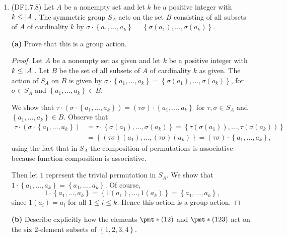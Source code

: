 \documentclass[11pt]{article}
\newcommand{\cbr}[1]{\left\{#1\right\}}
\begin{document}
\begin{enumerate}
    \item (DF1.7.8) Let $A$ be a nonempty set and let $k$ be a positive integer with $k\leq \abs{A}$. The symmetric group $S_A$ acts on the set $B$ consisting of all subsets of $A$ of cardinality $k$ by $\sigma\cdot\cbr{a_1,\dots,a_k} = \cbr{\sigma(a_1),\dots,\sigma(a_k)}$.
    
    \textbf{(a)} Prove that this is a group action. \begin{proof}
      Let $A$ be a nonempty set as given and let $k$ be a positive integer with $k\leq \abs{A}$. Let $B$ be the set of all subsets of $A$ of cardinality $k$ as given. The action of $S_A$ on $B$ is given by $\sigma\cdot\cbr{a_1,\dots,a_k} = \cbr{\sigma(a_1),\dots,\sigma(a_k)}$, for $\sigma\in S_A$ and $\cbr{a_1,\dots,a_k} \in B$.

      We show that $\tau\cdot(\sigma\cdot \cbr{a_1,\dots,a_k}) = (\tau\sigma)\cdot \cbr{a_1,\dots,a_k}$ for $\tau, \sigma\in S_A$ and $\cbr{a_1,\dots,a_k} \in B$. Observe that \begin{align*}\tau\cdot(\sigma\cdot \cbr{a_1,\dots,a_k}) &= \tau \cdot \cbr{\sigma(a_1),\dots,\sigma(a_k)} = \cbr{\tau(\sigma(a_1)),\dots,\tau(\sigma(a_k))} \\ 
      &= \cbr{(\tau\sigma)(a_1),\dots,(\tau\sigma)(a_k)} = (\tau\sigma)\cdot \cbr{a_1,\dots,a_k},\end{align*} using the fact that in $S_A$ the composition of permutations is associative because function composition is associative.

      Then let $1$ represent the trivial permutation in $S_A$. We show that $1\cdot \cbr{a_1,\dots,a_k} = \cbr{a_1,\dots,a_k}$. Of course, \[1\cdot \cbr{a_1,\dots,a_k} = \cbr{1(a_1),\dots,1(a_k)} = \cbr{a_1,\dots,a_k},\] since $1(a_i) = a_i$ for all $1\leq i\leq k$. Hence this action is a group action.
    \end{proof}

    \textbf{(b)} Describe explicitly how the elements $\pmt*{(12)}$ and $\pmt*{(123)}$ act on the six $2$-element subsets of $\cbr{1,2,3,4}$.


\end{enumerate}
\end{document}
